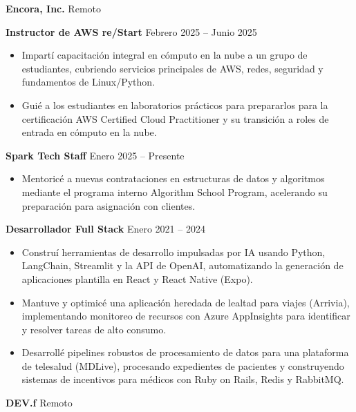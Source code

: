 \documentclass[11pt]{article}
\begin{document}
\textbf{Encora, Inc.} \hfill Remoto

\textbf{Instructor de AWS re/Start} \hfill Febrero 2025 -- Junio 2025
\begin{itemize}[noitemsep, topsep=0pt, partopsep=0pt, parsep=0pt]
    \item Impartí capacitación integral en cómputo en la nube a un grupo de estudiantes, cubriendo servicios principales de AWS, redes, seguridad y fundamentos de Linux/Python.
    \item Guié a los estudiantes en laboratorios prácticos para prepararlos para la certificación AWS Certified Cloud Practitioner y su transición a roles de entrada en cómputo en la nube.
\end{itemize}

\vspace{8pt}

\textbf{Spark Tech Staff} \hfill Enero 2025 -- Presente
\begin{itemize}[noitemsep, topsep=0pt, partopsep=0pt, parsep=0pt]
    \item Mentoricé a nuevas contrataciones en estructuras de datos y algoritmos mediante el programa interno Algorithm School Program, acelerando su preparación para asignación con clientes.
\end{itemize}

\vspace{8pt}

\textbf{Desarrollador Full Stack} \hfill Enero 2021 -- 2024
\begin{itemize}[noitemsep, topsep=0pt, partopsep=0pt, parsep=0pt]
    \item Construí herramientas de desarrollo impulsadas por IA usando Python, LangChain, Streamlit y la API de OpenAI, automatizando la generación de aplicaciones plantilla en React y React Native (Expo).
    \item Mantuve y optimicé una aplicación heredada de lealtad para viajes (Arrivia), implementando monitoreo de recursos con Azure AppInsights para identificar y resolver tareas de alto consumo.
    \item Desarrollé pipelines robustos de procesamiento de datos para una plataforma de telesalud (MDLive), procesando expedientes de pacientes y construyendo sistemas de incentivos para médicos con Ruby on Rails, Redis y RabbitMQ.
\end{itemize}

\vspace{8pt}

\textbf{DEV.f} \hfill Remoto
\end{document}

